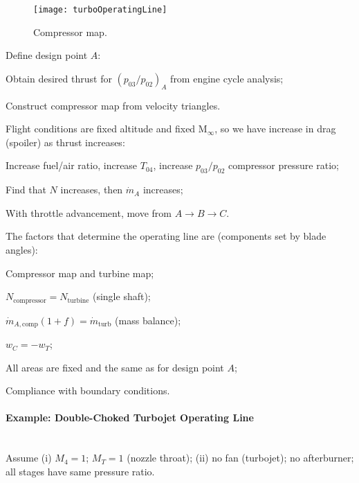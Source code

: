 \begin{figure}[!htb!]
 \centering
    {\texttt{[image: turboOperatingLine]}}
    \caption{\label{fig:operatingLine}Compressor map.}
\end{figure}

Define design point $A$:
\begin{itemizePacked}
\item Obtain desired thrust for $(p_{03}/p_{02})_A$ from engine cycle analysis;
\item Construct compressor map from velocity triangles.
\end{itemizePacked}

Flight conditions are fixed altitude and fixed M$_\infty$, so we have increase in drag (spoiler) as thrust increases:
\begin{itemizePacked}
\item Increase fuel/air ratio, increase $T_{04}$, increase $p_{03}/p_{02}$ compressor pressure ratio;
\item Find that $N$ increases, then $\dot{m}_A$ increases;
\item With throttle advancement, move from $A \rightarrow B \rightarrow C$.
\end{itemizePacked}

The factors that determine the operating line are (components set by blade angles):
\begin{itemizePacked}
\item Compressor map and turbine map;
\item $N_\text{compressor} = N_\text{turbine}$ (single shaft);
\item $\dot{m}_{A,\text{comp}}(1+f) = \dot{m}_\text{turb}$ (mass balance);
\item $w_C = - w_T$;
\item All areas are fixed and the same as for design point $A$;
\item Compliance with boundary conditions.
\end{itemizePacked}

\paragraph{Example: Double-Choked Turbojet Operating Line}  \mbox{}\\[0.5em]
Assume (i) $M_4 = 1$; $M_T = 1$ (nozzle throat); (ii) no fan (turbojet); no afterburner; all stages have same pressure ratio.

